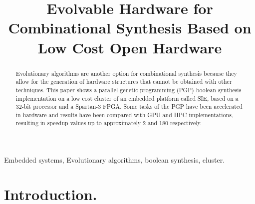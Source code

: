 \documentclass[runningheads,a4paper]{llncs}
\begin{document}
\mainmatter  %

\title{Evolvable Hardware for Combinational Synthesis Based on Low Cost Open Hardware}


%
%





\maketitle

\begin{abstract}
Evolutionary algorithms are another option for combinational synthesis because they allow for the generation of hardware structures that cannot be obtained with other techniques. This paper shows a parallel genetic programming (PGP) boolean synthesis implementation on a low cost cluster of an embedded platform called SIE, based on a 32-bit processor and a Spartan-3 FPGA. Some tasks of the PGP have been accelerated in hardware and results have been compared with GPU and HPC implementations, resulting in speedup values up to approximately 2 and 180 respectively.
\end{abstract}

\begin{keywords}
Embedded systems, Evolutionary algorithms, boolean synthesis, cluster.
\end{keywords}
\section{Introduction.}
\end{document}
